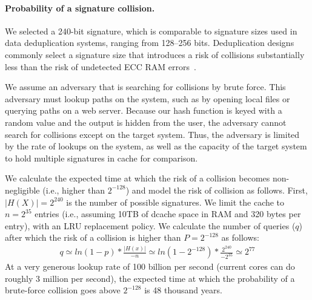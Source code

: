 

\paragraph{Probability of a signature collision.}
We selected a 240-bit signature, 
which is comparable to signature sizes used in data 
deduplication systems, ranging from 128--256 bits.  Deduplication designs commonly 
select a signature size that introduces a
risk of collisions substantially less than the risk of undetected ECC RAM 
errors~\citep{Debnath:2010:CSU:1855840.1855856, Srinivasan:2012:ILI:2208461.2208485, Quinlan:2002:VNA:645371.651321, Zhu:2008:ADB:1364813.1364831}.

We assume an adversary that is searching for collisions by brute force.
This adversary must lookup paths on the system,
such as by opening local files or querying paths on a web server.
Because our hash function is keyed with a random value and the output is 
hidden from the user,
the adversary cannot search for collisions except on the target system.
Thus, the adversary is limited by the rate of lookups on the system,
as well as the capacity of the target system to hold multiple signatures
in cache for comparison.

We calculate the expected time 
at which the risk of a collision becomes non-negligible (i.e., higher than $2^{-128}$) 
and model the risk of collision as follows.
First, $|H(X)|=2^{240}$ is
the number of possible signatures.
We  limit the cache to $n=2^{35}$ entries (i.e., assuming 10TB of dcache space in RAM and 320 bytes per entry),
with an LRU replacement policy.
We calculate the number of queries ($q$) after which the risk of a collision is 
higher than $P=2^{-128}$ as follows:
\begin{align*}
q \simeq ln(1 - p) * \frac{|H(x)|}{-n} \simeq ln(1-2^{-128}) * \frac{2^{240}}{-2^{35}} \simeq 2^{77}
\end{align*}
At a very generous 
lookup rate of 100 billion per second (current cores can
do roughly 3 million per second),
the expected time 
at which the probability of a brute-force collision goes above $2^{-128}$
is 48 thousand years.

